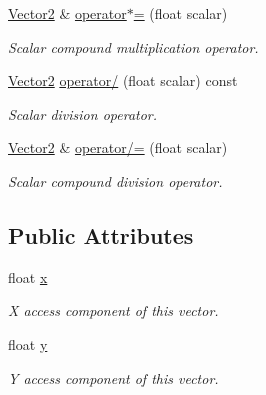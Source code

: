 \begin{DoxyCompactItemize}
\hyperlink{classchaos_1_1gfx_1_1_vector2}{Vector2} \& \hyperlink{classchaos_1_1gfx_1_1_vector2_a7ec2f2358e64d1164652ad2f8acfc556}{operator$\ast$=} (float scalar)
\begin{DoxyCompactList}\small\item\em Scalar compound multiplication operator. \end{DoxyCompactList}\item 
\hyperlink{classchaos_1_1gfx_1_1_vector2}{Vector2} \hyperlink{classchaos_1_1gfx_1_1_vector2_a86fcd257dd859953cafffd69be1616f8}{operator/} (float scalar) const 
\begin{DoxyCompactList}\small\item\em Scalar division operator. \end{DoxyCompactList}\item 
\hyperlink{classchaos_1_1gfx_1_1_vector2}{Vector2} \& \hyperlink{classchaos_1_1gfx_1_1_vector2_abc4ba70fb8c781d02f97cce17f2ef31a}{operator/=} (float scalar)
\begin{DoxyCompactList}\small\item\em Scalar compound division operator. \end{DoxyCompactList}\end{DoxyCompactItemize}
\subsection*{Public Attributes}
\begin{DoxyCompactItemize}
\item 
\hypertarget{classchaos_1_1gfx_1_1_vector2_a98989a2809ad9c6ac3091550ad5f5118}{float \hyperlink{classchaos_1_1gfx_1_1_vector2_a98989a2809ad9c6ac3091550ad5f5118}{x}}\label{classchaos_1_1gfx_1_1_vector2_a98989a2809ad9c6ac3091550ad5f5118}

\begin{DoxyCompactList}\small\item\em X access component of this vector. \end{DoxyCompactList}\item 
\hypertarget{classchaos_1_1gfx_1_1_vector2_adf4d8ed8e49c84c2fe1596c2b9d55d49}{float \hyperlink{classchaos_1_1gfx_1_1_vector2_adf4d8ed8e49c84c2fe1596c2b9d55d49}{y}}\label{classchaos_1_1gfx_1_1_vector2_adf4d8ed8e49c84c2fe1596c2b9d55d49}

\begin{DoxyCompactList}\small\item\em Y access component of this vector. \end{DoxyCompactList}\end{DoxyCompactItemize}


